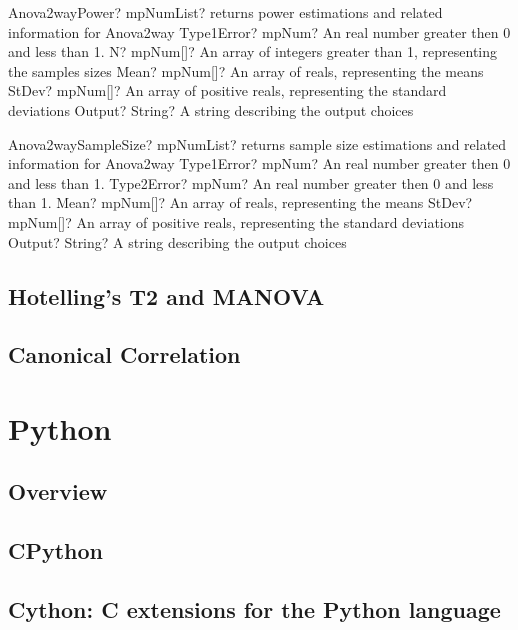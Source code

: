 \documentclass[12pt,a4paper,openany]{book}
\begin{document}
\begin{mpFunctionsExtract}
\mpFunctionFiveNotImplemented
{Anova2wayPower? mpNumList? returns power estimations and related information for Anova2way}
{Type1Error? mpNum? An real number greater then 0 and less than 1.}
{N? mpNum[]? An array of integers greater than 1, representing the samples sizes}
{Mean? mpNum[]? An array of reals, representing the means}
{StDev? mpNum[]? An array of positive reals, representing the standard deviations}
{Output? String? A string describing the output choices}
\end{mpFunctionsExtract}

\begin{mpFunctionsExtract}
\mpFunctionFiveNotImplemented
{Anova2waySampleSize? mpNumList? returns sample size estimations and related information for Anova2way}
{Type1Error? mpNum? An real number greater then 0 and less than 1.}
{Type2Error? mpNum? An real number greater then 0 and less than 1.}
{Mean? mpNum[]? An array of reals, representing the means}
{StDev? mpNum[]? An array of positive reals, representing the standard deviations}
{Output? String? A string describing the output choices}
\end{mpFunctionsExtract}

\section{Hotelling's T2 and MANOVA}

\section{Canonical Correlation}

\chapter{Python}

\section{Overview}

\section{CPython}

\section{Cython: C extensions for the Python language}
\end{document}
